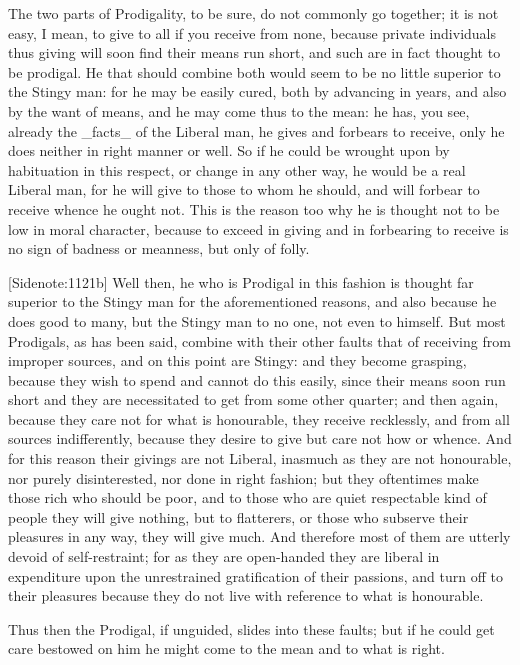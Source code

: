 The two parts of Prodigality, to be sure, do not commonly go together;
it is not easy, I mean, to give to all if you receive from none, because
private individuals thus giving will soon find their means run short,
and such are in fact thought to be prodigal. He that should combine both
would seem to be no little superior to the Stingy man: for he may be
easily cured, both by advancing in years, and also by the want of means,
and he may come thus to the mean: he has, you see, already the _facts_
of the Liberal man, he gives and forbears to receive, only he does
neither in right manner or well. So if he could be wrought upon by
habituation in this respect, or change in any other way, he would be a
real Liberal man, for he will give to those to whom he should, and will
forbear to receive whence he ought not. This is the reason too why he is
thought not to be low in moral character, because to exceed in giving
and in forbearing to receive is no sign of badness or meanness, but only
of folly.

[Sidenote:1121b] Well then, he who is Prodigal in this fashion is
thought far superior to the Stingy man for the aforementioned reasons,
and also because he does good to many, but the Stingy man to no one,
not even to himself. But most Prodigals, as has been said, combine with
their other faults that of receiving from improper sources, and on this
point are Stingy: and they become grasping, because they wish to spend
and cannot do this easily, since their means soon run short and they are
necessitated to get from some other quarter; and then again, because
they care not for what is honourable, they receive recklessly, and from
all sources indifferently, because they desire to give but care not how
or whence. And for this reason their givings are not Liberal, inasmuch
as they are not honourable, nor purely disinterested, nor done in right
fashion; but they oftentimes make those rich who should be poor, and to
those who are quiet respectable kind of people they will give nothing,
but to flatterers, or those who subserve their pleasures in any way,
they will give much. And therefore most of them are utterly devoid
of self-restraint; for as they are open-handed they are liberal in
expenditure upon the unrestrained gratification of their passions, and
turn off to their pleasures because they do not live with reference to
what is honourable.

Thus then the Prodigal, if unguided, slides into these faults; but if he
could get care bestowed on him he might come to the mean and to what is
right.

